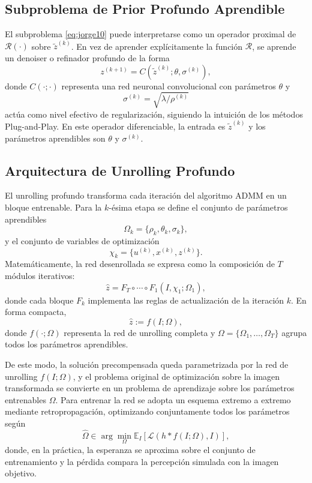 \documentclass[conference]{IEEEtran}
\begin{document}
\subsection{Subproblema de Prior Profundo Aprendible}
El subproblema \eqref{eq:jorge10} puede interpretarse como un operador proximal de $\mathcal{R}(\cdot)$ sobre $\tilde{z}^{(k)}$. En vez de aprender explícitamente la función $\mathcal{R}$, se aprende un denoiser o refinador profundo de la forma
\begin{equation}
z^{(k+1)}
=
C\!\left(\tilde{z}^{(k)};\theta,\sigma^{(k)}\right),
\label{eq:jorge17}
\end{equation}
donde $C(\cdot;\cdot)$ representa una red neuronal convolucional con parámetros $\theta$ y
\[
\sigma^{(k)}=\sqrt{\lambda/\rho^{(k)}}
\]
actúa como nivel efectivo de regularización, siguiendo la intuición de los métodos Plug-and-Play. En este operador diferenciable, la entrada es $\tilde{z}^{(k)}$ y los parámetros aprendibles son $\theta$ y $\sigma^{(k)}$.

\subsection{Arquitectura de Unrolling Profundo}
El unrolling profundo transforma cada iteración del algoritmo ADMM en un bloque entrenable. Para la $k$-ésima etapa se define el conjunto de parámetros aprendibles
\[
\Omega_k=\{\rho_k,\theta_k,\sigma_k\},
\]
y el conjunto de variables de optimización
\[
\chi_k=\{u^{(k)},x^{(k)},z^{(k)}\}.
\]
Matemáticamente, la red desenrollada se expresa como la composición de $T$ módulos iterativos:
\begin{equation}
\hat{z}
=
F_T\circ\cdots\circ F_1\!\left(I,\chi_1;\Omega_1\right),
\label{eq:jorge18}
\end{equation}
donde cada bloque $F_k$ implementa las reglas de actualización de la iteración $k$. En forma compacta,
\begin{equation}
\hat{z}:=f(I;\Omega),
\label{eq:jorge19}
\end{equation}
donde $f(\cdot;\Omega)$ representa la red de unrolling completa y $\Omega=\{\Omega_1,\ldots,\Omega_T\}$ agrupa todos los parámetros aprendibles.

De este modo, la solución precompensada queda parametrizada por la red de unrolling $f(I;\Omega)$, y el problema original de optimización sobre la imagen transformada se convierte en un problema de aprendizaje sobre los parámetros entrenables $\Omega$. Para entrenar la red se adopta un esquema extremo a extremo mediante retropropagación, optimizando conjuntamente todos los parámetros según
\begin{equation}
\hat{\Omega}
\in
\arg\min_{\Omega}
\mathbb{E}_{I}
\left[
\mathcal{L}\!\left(h*f(I;\Omega),I\right)
\right],
\label{eq:jorge20}
\end{equation}
donde, en la práctica, la esperanza se aproxima sobre el conjunto de entrenamiento y la pérdida compara la percepción simulada con la imagen objetivo.
\end{document}
